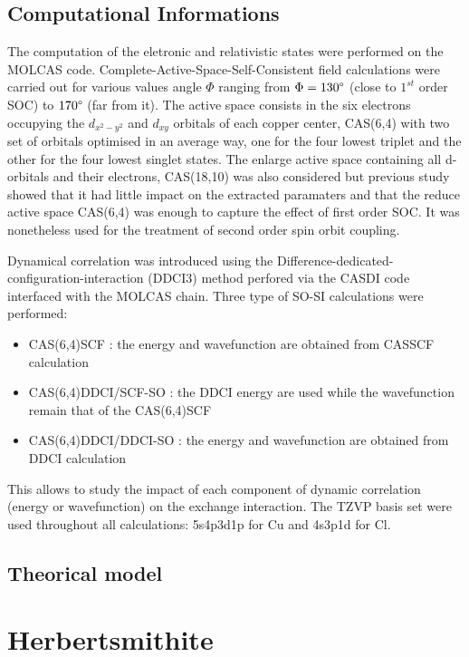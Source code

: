 \documentclass[10pt]{report}
\numberwithin{equation}{section}
\begin{document}
\section{Computational Informations}

The computation of the eletronic and relativistic states were performed on the MOLCAS code.
Complete-Active-Space-Self-Consistent field calculations were carried out for various values angle $\Phi$ ranging from $\Phi=130\degree$ (close to $1^{st}$ order SOC) to $170\degree$ (far from it).
The active space consists in the six electrons occupying the $d_{x^2-y^2}$ and $d_{xy}$ orbitals of each copper center, CAS(6,4) with two set of orbitals optimised in an average way, one for the four lowest triplet and the other for the four lowest singlet states.
The enlarge active space containing all d-orbitals and their electrons, CAS(18,10) was also considered but previous study showed that it had little impact on the extracted paramaters and that the reduce active space CAS(6,4) was enough to capture the effect of first order SOC.
It was nonetheless used for the treatment of second order spin orbit coupling.

Dynamical correlation was introduced using the Difference-dedicated-configuration-interaction (DDCI3) method perfored via the CASDI code interfaced with the MOLCAS chain.
Three type of SO-SI calculations were performed:
\begin{itemize}
    \item CAS(6,4)SCF : the energy and wavefunction are obtained from CASSCF calculation
    \item CAS(6,4)DDCI/SCF-SO : the DDCI energy are used while the wavefunction remain that of the CAS(6,4)SCF
    \item CAS(6,4)DDCI/DDCI-SO : the energy and wavefunction are obtained from DDCI calculation
\end{itemize}
This allows to study the impact of each component of dynamic correlation (energy or wavefunction) on the exchange interaction.
The TZVP basis set were used throughout all calculations: 5s4p3d1p for Cu and 4s3p1d for Cl.

\section{Theorical model}



\chapter{Herbertsmithite}
\end{document}
